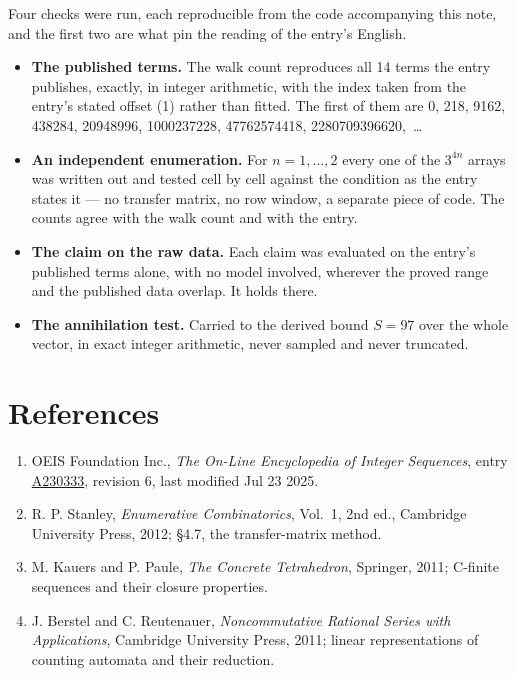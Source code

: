 \documentclass[11pt]{article}
\theoremstyle{definition}
\begin{document}
Four checks were run, each reproducible from the code accompanying this note, and the first two are what pin the reading of the entry's English.

\begin{itemize}

\item {\bfseries The published terms.} The walk count reproduces all 14 terms the entry publishes, exactly, in integer arithmetic, with the index taken from the entry's stated offset (1) rather than fitted. The first of them are 0, 218, 9162, 438284, 20948996, 1000237228, 47762574418, 2280709396620,~\dots

\item {\bfseries An independent enumeration.} For $n = 1,\dots,2$ every one of the $3^{4n}$ arrays was written out and tested cell by cell against the condition as the entry states it --- no transfer matrix, no row window, a separate piece of code. The counts agree with the walk count and with the entry.

\item {\bfseries The claim on the raw data.} Each claim was evaluated on the entry's published terms alone, with no model involved, wherever the proved range and the published data overlap. It holds there.

\item {\bfseries The annihilation test.} Carried to the derived bound $S = 97$ over the whole vector, in exact integer arithmetic, never sampled and never truncated.

\end{itemize}

\section{References}

\begin{enumerate}

\item OEIS Foundation Inc., \emph{The On-Line Encyclopedia of Integer Sequences}, entry \href{https://oeis.org/A230333}{A230333}, revision 6, last modified Jul 23 2025.

\item R. P. Stanley, \emph{Enumerative Combinatorics}, Vol.~1, 2nd ed., Cambridge University Press, 2012; \S4.7, the transfer-matrix method.

\item M. Kauers and P. Paule, \emph{The Concrete Tetrahedron}, Springer, 2011; C-finite sequences and their closure properties.

\item J. Berstel and C. Reutenauer, \emph{Noncommutative Rational Series with Applications}, Cambridge University Press, 2011; linear representations of counting automata and their reduction.

\end{enumerate}
\end{document}
